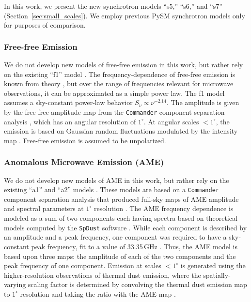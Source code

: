 \documentclass[twocolumn]{aastex631}
\begin{document}
In this work, we present the new synchrotron models ``s5,'' ``s6,'' and ``s7'' (Section~\ref{sec:small_scales}). We employ previous PySM synchrotron models only for purposes of comparison.

\subsubsection{Free-free Emission}
We do not develop new models of free-free emission in this work, but rather rely on the existing ``f1'' model \citep{Thorne:2017}. The frequency-dependence of free-free emission is known from theory \citep[][and references therein]{Draine:2011}, but over the range of frequencies relevant for microwave observations, it can be approximated as a simple power law. The f1 model assumes a sky-constant power-law behavior $S_\nu \propto \nu^{-2.14}$. The amplitude is given by the free-free amplitude map from the \texttt{Commander} component separation analysis \citep{planck2014-a12}, which has an angular resolution of $1^\circ$. At angular scales $<1^\circ$, the emission is based on Gaussian random fluctuations modulated by the intensity map \citep[see][for details]{Thorne:2017}. Free-free emission is assumed to be unpolarized.

\subsubsection{Anomalous Microwave Emission (AME)}
We do not develop new models of AME in this work, but rather rely on the existing ``a1'' and ``a2'' models \citep{Thorne:2017}. These models are based on a \texttt{Commander} component separation analysis that produced full-sky maps of AME amplitude and spectral parameters at $1^\circ$ resolution \citep{planck2014-a12}. The AME frequency dependence is modeled as a sum of two components each having spectra based on theoretical models computed by the \texttt{SpDust} software \citep{Ali-Haimoud:2009, Silsbee:2011}. While each component is described by an amplitude and a peak frequency, one component was required to have a sky-constant peak frequency, fit to a value of 33.35\,GHz \citep{planck2014-a12}. Thus, the AME model is based upon three maps: the amplitude of each of the two components and the peak frequency of one component. Emission at scales $<1^\circ$ is generated using the higher-resolution observations of thermal dust emission, where the spatially-varying scaling factor is determined by convolving the thermal dust emission map to $1^\circ$ resolution and taking the ratio with the AME map \citep{Thorne:2017}.
\end{document}
